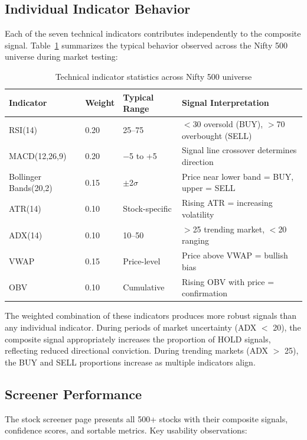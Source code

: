 \documentclass[12pt, a4paper, oneside]{report}
\begin{document}
\subsection{Individual Indicator Behavior}

Each of the seven technical indicators contributes independently to the composite signal. Table~\ref{tab:indicator_stats} summarizes the typical behavior observed across the Nifty 500 universe during market testing:

\begin{table}[H]
\centering
\caption{Technical indicator statistics across Nifty 500 universe}
\label{tab:indicator_stats}
\begin{tabularx}{\textwidth}{@{}l l l X@{}}
\toprule
\textbf{Indicator} & \textbf{Weight} & \textbf{Typical Range} & \textbf{Signal Interpretation} \\
\midrule
RSI(14) & 0.20 & 25--75 & $<$30 oversold (BUY), $>$70 overbought (SELL) \\
MACD(12,26,9) & 0.20 & $-$5 to +5 & Signal line crossover determines direction \\
Bollinger Bands(20,2) & 0.15 & $\pm$2$\sigma$ & Price near lower band = BUY, upper = SELL \\
ATR(14) & 0.10 & Stock-specific & Rising ATR = increasing volatility \\
ADX(14) & 0.10 & 10--50 & $>$25 trending market, $<$20 ranging \\
VWAP & 0.15 & Price-level & Price above VWAP = bullish bias \\
OBV & 0.10 & Cumulative & Rising OBV with price = confirmation \\
\bottomrule
\end{tabularx}
\end{table}

The weighted combination of these indicators produces more robust signals than any individual indicator. During periods of market uncertainty (ADX $<$ 20), the composite signal appropriately increases the proportion of HOLD signals, reflecting reduced directional conviction. During trending markets (ADX $>$ 25), the BUY and SELL proportions increase as multiple indicators align.

\subsection{Screener Performance}

The stock screener page presents all 500+ stocks with their composite signals, confidence scores, and sortable metrics. Key usability observations:
\end{document}
